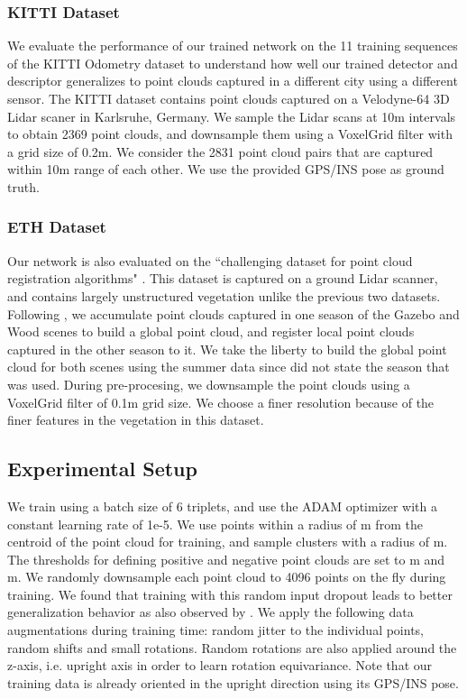 \documentclass[runningheads]{llncs}
\begin{document}
\subsubsection{KITTI Dataset}
We evaluate the performance of our trained network on the 11 training sequences of the KITTI Odometry dataset \cite{kitti} to understand how well our trained detector and descriptor generalizes to point clouds captured in a different city using a different sensor. The KITTI dataset contains point clouds captured on a Velodyne-64 3D Lidar scaner in Karlsruhe, Germany. We sample the Lidar scans at 10m intervals to obtain 2369 point clouds, and downsample them using a VoxelGrid filter with a grid size of 0.2m. We consider the 2831 point cloud pairs that are captured within 10m range of each other. We use the provided GPS/INS pose as ground truth.

\subsubsection{ETH Dataset}
Our network is also evaluated on the ``challenging dataset for point cloud registration algorithms"  \cite{ethdata}. This dataset is captured on a ground Lidar scanner, and contains largely unstructured vegetation unlike the previous two datasets. Following \cite{Elbaz2017CVPR}, we accumulate point clouds captured in one season of the Gazebo and Wood scenes to build a global point cloud, and register local point clouds captured in the other season to it. We take the liberty to build the global point cloud for both scenes using the summer data since \cite{Elbaz2017CVPR} did not state the season that was used.
During pre-procesing, we downsample the point clouds using a VoxelGrid filter of 0.1m grid size. We choose a finer resolution because of the finer features in the vegetation in this dataset. 


\subsection{Experimental Setup}
We train using a batch size of 6 triplets, and use the ADAM optimizer with a constant learning rate of 1e-5. We use points within a radius of m from the centroid of the point cloud for training, and sample  clusters with a radius of m. The thresholds for defining positive and negative point clouds are set to m and m. We randomly downsample each point cloud to 4096 points on the fly during training. 
We found that training with this random input dropout leads to better generalization behavior as also observed by \cite{pointnetpp}. We apply the following data augmentations during training time: random jitter to the individual points, random shifts and small rotations. Random rotations are also applied around the z-axis, i.e. upright axis in order to learn rotation equivariance. Note that our training data is already oriented in the upright direction using its GPS/INS pose.
\end{document}
